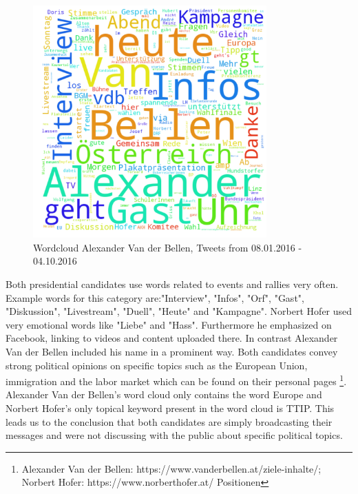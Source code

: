 \documentclass{llncs}
\begin{document}
\newpage
\begin{figure}[htbp] 
	\centering
	\includegraphics[width=0.8\textwidth]{grafics/wordcloud_vdb.png}
	\caption{Wordcloud Alexander Van der Bellen, Tweets from 08.01.2016 - 04.10.2016}
	\label{fig:Wordcloud Alexander Van der Bellen}
\end{figure}
Both presidential candidates use words related to events and rallies very often. Example words for this category are:"Interview", "Infos", "Orf", "Gast", "Diskussion", "Livestream", "Duell", "Heute" and "Kampagne". Norbert Hofer used very emotional words like "Liebe" and "Hass". Furthermore he emphasized on Facebook, linking to videos and content uploaded there. In contrast Alexander Van der Bellen included his name in a prominent way. Both candidates convey strong political opinions on specific topics such as the European Union, immigration and the labor market which can be found on their personal pages \footnote{Alexander Van der Bellen: https://www.vanderbellen.at/ziele-inhalte/; Norbert Hofer: https://www.norberthofer.at/ Positionen}. Alexander Van der Bellen's word cloud only contains the word Europe and Norbert Hofer's only topical keyword present in the word cloud is TTIP. This leads us to the conclusion that both candidates are simply broadcasting their messages and were not discussing with the public about specific political topics.
\newpage
\end{document}
